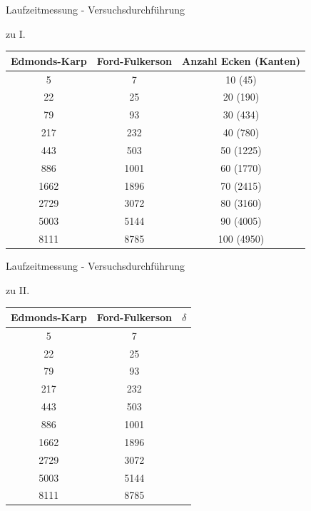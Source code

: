 \documentclass{beamer}
\begin{document}
    \begin{frame}{Laufzeitmessung - Versuchsdurchf\"uhrung}
        \begin{block}{zu I.}
            \begin{center}
                \begin{tabular}{c|c|c}
                    \textbf{Edmonds-Karp} & \textbf{Ford-Fulkerson} & Anzahl Ecken (Kanten)\\
                    \hline
                    5 & 7 & 10 (45)\\
                    22 & 25 & 20 (190)\\
                    79 & 93 & 30 (434)\\
                    217 & 232 & 40 (780)\\
                    443 & 503 & 50 (1225)\\
                    886 & 1001 & 60 (1770)\\
                    1662 & 1896 & 70 (2415)\\
                    2729 & 3072 & 80 (3160)\\
                    5003 & 5144 & 90 (4005)\\
                    8111 & 8785 & 100 (4950)\\
                \end{tabular}
            \end{center}
        \end{block}
    \end{frame}

    \begin{frame}{Laufzeitmessung - Versuchsdurchf\"uhrung}
        \begin{block}{zu II.}
            \begin{center}
                \begin{tabular}{c|c|c}
                    \textbf{Edmonds-Karp} & \textbf{Ford-Fulkerson} & $\delta$\\
                    \hline
                    5 & 7 &\\
                    22 & 25 &\\
                    79 & 93 &\\
                    217 & 232 &\\
                    443 & 503 &\\
                    886 & 1001 &\\
                    1662 & 1896 &\\
                    2729 & 3072 &\\
                    5003 & 5144 &\\
                    8111 & 8785 &\\
                \end{tabular}
            \end{center}
        \end{block}
    \end{frame}
\end{document}
